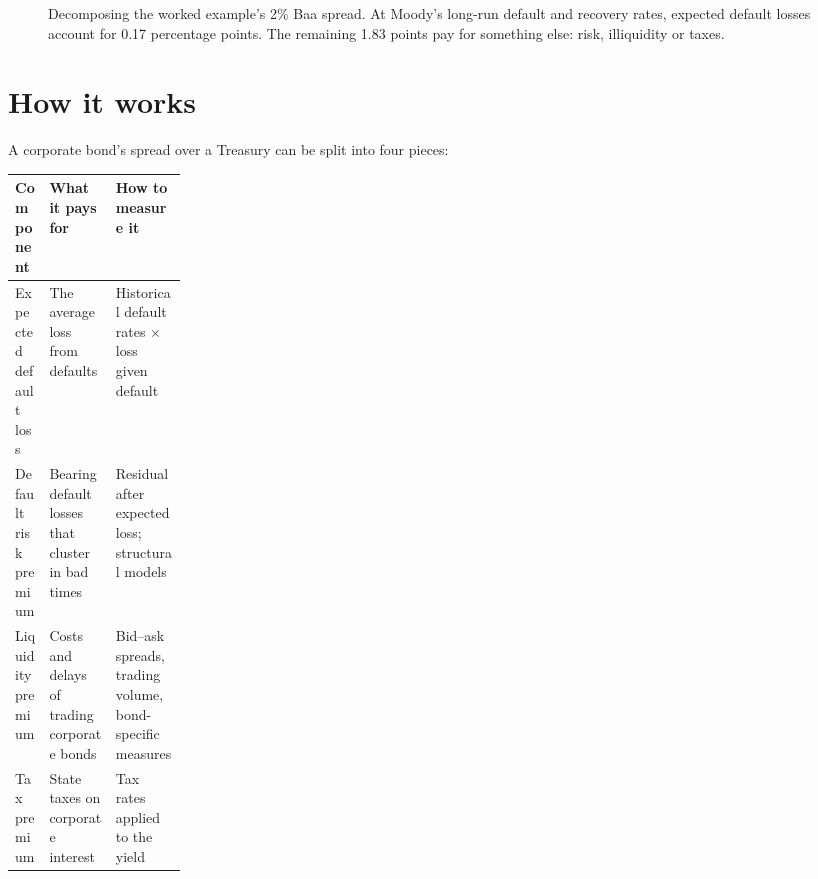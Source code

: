 \begin{figure}[htbp]
\centering
{}
\caption{Decomposing the worked example's 2\% Baa spread. At Moody's long-run default and recovery rates, expected default losses account for 0.17 percentage points. The remaining 1.83 points pay for something else: risk, illiquidity or taxes.}
\label{fig:18-decomp}
\end{figure}

\section{How it works}
\label{sec:18-how}

A corporate bond's spread over a Treasury can be split into four pieces:

\begin{center}
\small
\begin{tabularx}{0.9\linewidth}{@{}>{\raggedright\arraybackslash}p{0.2\linewidth}>{\raggedright\arraybackslash}X>{\raggedright\arraybackslash}X@{}}
\toprule
Component & What it pays for & How to measure it \\
\midrule
Expected default loss & The average loss from defaults & Historical default rates $\times$ loss given default \\
Default risk premium & Bearing default losses that cluster in bad times & Residual after expected loss; structural models \\
Liquidity premium & Costs and delays of trading corporate bonds & Bid--ask spreads, trading volume, bond-specific measures \\
Tax premium & State taxes on corporate interest & Tax rates applied to the yield \\
\bottomrule
\end{tabularx}
\end{center}

